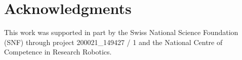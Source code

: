 \section*{Acknowledgments}

This work was supported in part by the Swiss National Science Foundation (SNF) through project 200021\_149427 / 1 and the National Centre of Competence in Research Robotics.